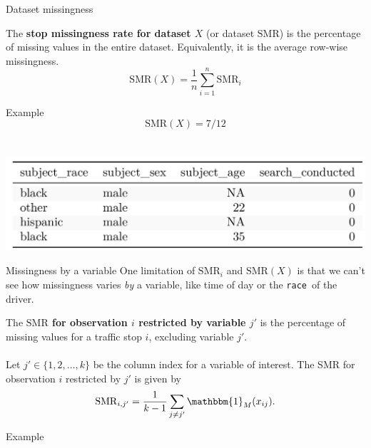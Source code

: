 \documentclass[11pt]{beamer}
\newcommand{\indic}{\mathbbm{1}_M}
\newcommand{\SMR}{\mathrm{SMR}}
\newcommand{\race}{\texttt{race}}
\begin{document}

\begin{frame}{Dataset missingness}
    \begin{definition}
    The {\bf{stop missingness rate for dataset $X$}} (or dataset $\SMR$) is the percentage of missing values in the entire dataset. Equivalently, it is the average row-wise missingness. 
    \begin{equation*}
    \SMR(X) = \dfrac{1}{n} \sum_{i = 1}^{n} \SMR_i
    \end{equation*}
    \end{definition}
    Example
    \begin{equation*}
    \SMR(X) = 7/12
    \end{equation*}
    \\~\\
    \includegraphics{fig/toyoak.png}
\end{frame}

\begin{frame}{Missingness by a variable}
    One limitation of $\SMR_i$ and $\SMR(X)$ is that we can't see how missingness varies \emph{by} a variable, like time of day or the \race \, of the driver. 
    \begin{definition}
    The {\bf{$\SMR$ for observation $i$ restricted by variable $j'$}} is the percentage of missing values for a traffic stop $i$, excluding variable $j'$. 
    \\~\\
    Let $j' \in \{1, 2, \ldots, k\}$ be the column index for a variable of interest. The SMR for observation $i$ restricted by $j'$ is given by
    \begin{equation*}
    \SMR_{i, j'} = \dfrac{1}{k-1} \sum_{j \neq j'} \indic(x_{ij}).
    \end{equation*}
    \end{definition}
    Example
\end{frame}
\end{document}
